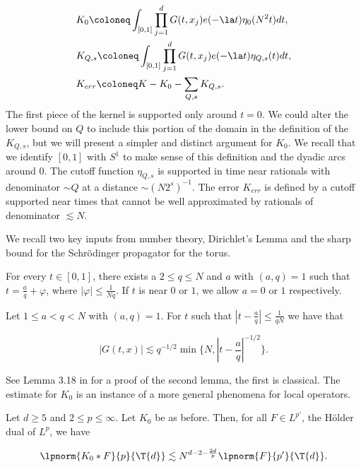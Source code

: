 \documentclass[11pt]{amsart}
\begin{document}
\begin{align*}
    &K_0 \coloneq \int_{[0,1]}\prod_{j=1}^d G(t,x_j)e(-\la t)\eta_0(N^2 t)dt,\\
    &K_{Q,s} \coloneq \int_{[0,1]}\prod_{j=1}^d G(t,x_j)e(-\la t)\eta_{Q,s}(t)dt,\\
    &K_{err} \coloneq K - K_0 - \sum_{Q,s}K_{Q,s}.
\end{align*}
The first piece of the kernel is supported only around $t=0$. We could alter the lower bound on $Q$ to include this portion of the domain in the definition of the $K_{Q,s}$, but we will present a simpler and distinct argument for $K_0$. We recall that we identify $[0,1]$ with $S^1$ to make sense of this definition and the dyadic arcs around $0$. The cutoff function $\eta_{Q,s}$ is supported in time near rationals with denominator $\sim Q$ at a distance $\sim (N2^s)^{-1}$. The error $K_{err}$ is defined by a cutoff supported near times that cannot be well approximated by rationals of denominator $\lesssim N$. 

We recall two key inputs from number theory, Dirichlet's Lemma and the sharp bound for the Schr\"odinger propagator for the torus.

\begin{lemma}\label{3: dirichlet'sLemma}
    For every $t\in[0,1]$, there exists a $2\leq q \leq N$ and $a$ with $(a,q)=1$ such that $t = \frac{a}{q}+\varphi$, where $|\varphi|\leq \frac{1}{Nq}$. If $t$ is near $0$ or $1$, we allow $a=0$ or $1$ respectively.
\end{lemma}

\begin{lemma}\label{3: propogatorDisperseiveLemma}
Let $1\leq a < q <N$ with $(a,q)=1$. For $t$ such that $|t- \frac{a}{q}|\leq \frac{1}{qN}$ we have that

\begin{equation}\label{3: propogatorDisperseiveEqn}
    |G(t,x)|\lesssim q^{-1/2}\min \{N, |t-\frac{a}{q}|^{-1/2}\}.
\end{equation}
\end{lemma}
See Lemma 3.18 in \cite{BourgainGAFALattice11993} for a proof of the second lemma, the first is classical. The estimate for $K_0$ is an instance of a more general phenomena for local operators.

\begin{proposition}\label{3: K0localBoundProp}
Let $d\geq 5$ and $2\leq p \leq \infty$. Let $K_0$ be as before. Then, for all $F\in L^{p'}$, the H\"older dual of $L^p$, we have

\begin{equation}\label{3: K0localBoundEqn}
    \lpnorm{K_0* F}{p}{\T{d}}\lesssim N^{d-2-\frac{2d}{p}}\lpnorm{F}{p'}{\T{d}}.
\end{equation}
\end{proposition}
\end{document}
